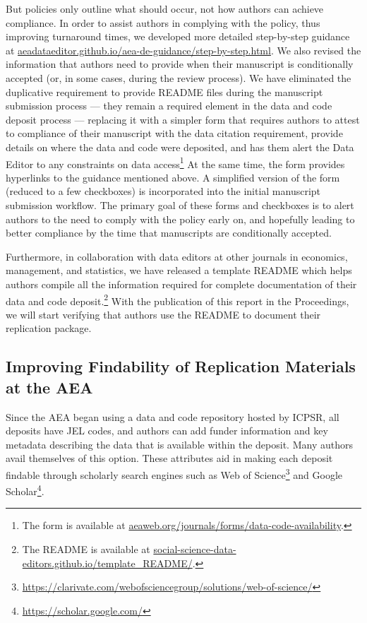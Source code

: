 \documentclass[PP]{AEA}
\newcommand{\urlcite}[2]{#2\footnote{\url{#1}}}
\begin{document}
But policies only outline what should occur, not how authors can achieve compliance. In order to assist authors in complying with the policy, thus improving turnaround times, we developed more detailed step-by-step guidance at \href{https://aeadataeditor.github.io/aea-de-guidance/step-by-step.html}{aeadataeditor.github.io/aea-de-guidance/step-by-step.html}. We also revised the information that authors need to provide when their manuscript is conditionally accepted (or, in some cases, during the review process). We have eliminated the duplicative requirement to provide  README files during the manuscript submission process --- they remain a required element in the data and code deposit process --- replacing it with a simpler form that requires authors to attest to compliance of their manuscript with the data citation requirement, provide details on where the data and code were deposited, and has them alert the Data Editor to any constraints on data access\footnote{The form is available at \href{https://www.aeaweb.org/journals/forms/data-code-availability}{aeaweb.org/journals/forms/data-code-availability}.} At the same time, the form provides hyperlinks to the guidance mentioned above. A simplified version of the form (reduced to a few checkboxes) is incorporated into the initial manuscript submission workflow. The primary goal of these forms and checkboxes is to alert authors to the need to comply with the policy early on, and hopefully leading to better compliance by the time that manuscripts are conditionally accepted. 

Furthermore, in collaboration with data editors at other journals in economics, management, and statistics, we have released a template README \citep{READMEv1.0.0} which helps authors compile all the information required for complete documentation of their data and code deposit.\footnote{The README is available at \href{https://social-science-data-editors.github.io/template_README/}{social-science-data-editors.github.io/template\_README/}.} With the publication of this report in the Proceedings, we will start verifying that authors use the README to document their replication package.


\subsection{Improving Findability of Replication Materials at the AEA}
\label{sec:findability}

Since the AEA began using a data and code repository hosted by \ac{ICPSR}, all deposits have JEL codes, and authors can add funder information and key metadata describing the data that is available within the deposit. Many authors avail themselves of this option. These attributes aid in making each deposit  findable through scholarly search engines such as \urlcite{https://clarivate.com/webofsciencegroup/solutions/web-of-science/}{Web of Science} and \urlcite{https://scholar.google.com/}{Google Scholar}. 
\end{document}
